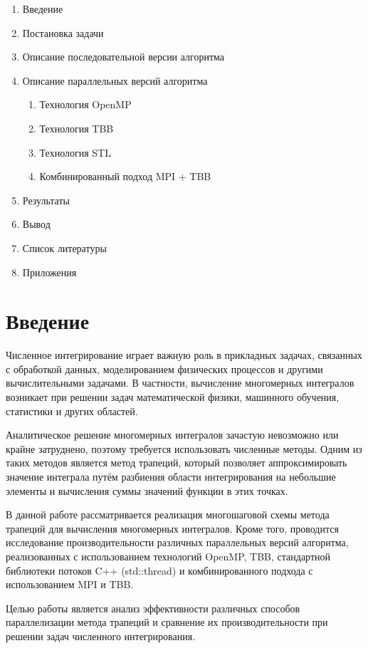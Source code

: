 \documentclass[a4paper,14pt]{article}
\begin{document}
\begin{enumerate}
    \item Введение
    \item Постановка задачи
    \item Описание последовательной версии алгоритма
    \item Описание параллельных версий алгоритма
    \begin{enumerate}
        \item Технология OpenMP
        \item Технология TBB
        \item Технология STL
        \item Комбинированный подход MPI + TBB
    \end{enumerate}
    \item Результаты
    \item Вывод
    \item Список литературы
    \item Приложения
\end{enumerate}


\newpage
\section{Введение}

Численное интегрирование играет важную роль в прикладных задачах, связанных с обработкой данных, моделированием физических процессов и другими вычислительными задачами. В частности, вычисление многомерных интегралов возникает при решении задач математической физики, машинного обучения, статистики и других областей.

Аналитическое решение многомерных интегралов зачастую невозможно или крайне затруднено, поэтому требуется использовать численные методы. Одним из таких методов является метод трапеций, который позволяет аппроксимировать значение интеграла путём разбиения области интегрирования на небольшие элементы и вычисления суммы значений функции в этих точках.

В данной работе рассматривается реализация многошаговой схемы метода трапеций для вычисления многомерных интегралов. Кроме того, проводится исследование производительности различных параллельных версий алгоритма, реализованных с использованием технологий OpenMP, TBB, стандартной библиотеки потоков C++ (std::thread) и комбинированного подхода с использованием MPI и TBB.

Целью работы является анализ эффективности различных способов параллелизации метода трапеций и сравнение их производительности при решении задач численного интегрирования.
\end{document}
